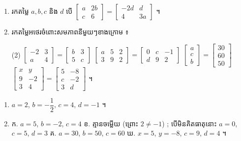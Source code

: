 \begin{pro}
\begin{enumerate}[1]
  \item រកតម្លៃ $a, b, c$ និង $d$ បើ $\begin{bmatrix} a & 2b\\ c & 6 \end{bmatrix} = \begin{bmatrix} -2d & d\\ 4 & 3a \end{bmatrix}$ ។
  \item រកតម្លៃអថេរចំពោះសមភាពនីមួយៗខាងក្រោម ៖
  \begin{tasks}(2)
    \task $\begin{bmatrix} -2 & 3\\ a & 4 \end{bmatrix} = \begin{bmatrix} b & 3\\ 5 & c \end{bmatrix}$
    \task $\begin{bmatrix} a & 5 & 2\\ 3 & 9 & 2 \end{bmatrix} = \begin{bmatrix} 0 & c & -1\\ d & 9 & 2 \end{bmatrix}$
    \task $\begin{bmatrix} a\\ c\\ b \end{bmatrix} = \begin{bmatrix} 30\\ 60\\ 50 \end{bmatrix}$
    \task $\begin{bmatrix} x & y\\ 9 & -2\\ 3 & 4 \end{bmatrix} = \begin{bmatrix} 5 & -8\\ c & -2\\ 3 & d \end{bmatrix}$ ។
  \end{tasks}
\end{enumerate}
\ans
\begin{enumerate}[1]
  \item $a = 2$, $b = -\dfrac{1}{2}$, $c = 4$, $d = -1$ ។
  \item ក. $a = 5$, $b = -2$, $c = 4$ \quad ខ. គ្មានចម្លើយ (ព្រោះ $2 \ne -1$) ; បើមិនគិតធាតុនោះ $a = 0$, $c = 5$, $d = 3$ \quad គ. $a = 30$, $b = 50$, $c = 60$ \quad ឃ. $x = 5$, $y = -8$, $c = 9$, $d = 4$ ។
\end{enumerate}
\end{pro}


